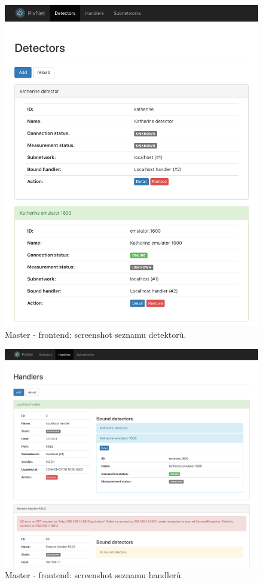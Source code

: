 \begin{figure}[h]
	\begin{center}
        \includegraphics[width=12cm]{figures/master_detectors.png}
	\end{center}
	\caption{Master - frontend: screenshot seznamu detektorů.}
	\label{fig:master:frontend:detectors}
\end{figure}

\begin{figure}[h]
	\begin{center}
        \includegraphics[width=15cm]{figures/master_handlers.png}
	\end{center}
	\caption{Master - frontend: screenshot seznamu handlerů.}
	\label{fig:master:frontend:handlers}
\end{figure}

